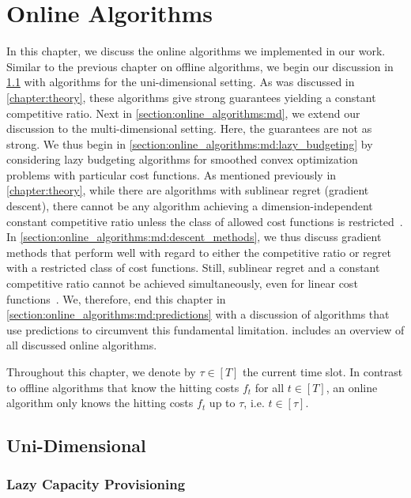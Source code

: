 
\chapter{Online Algorithms}\label{chapter:online_algorithms}

In this chapter, we discuss the online algorithms we implemented in our work. Similar to the previous chapter on offline algorithms, we begin our discussion in \cref{section:online_algorithms:ud} with algorithms for the uni-dimensional setting. As was discussed in \cref{chapter:theory}, these algorithms give strong guarantees yielding a constant competitive ratio. Next in \cref{section:online_algorithms:md}, we extend our discussion to the multi-dimensional setting. Here, the guarantees are not as strong. We thus begin in \cref{section:online_algorithms:md:lazy_budgeting} by considering lazy budgeting algorithms for smoothed convex optimization problems with particular cost functions. As mentioned previously in \cref{chapter:theory}, while there are algorithms with sublinear regret (gradient descent), there cannot be any algorithm achieving a dimension-independent constant competitive ratio unless the class of allowed cost functions is restricted~\cite{Chen2018}. In \cref{section:online_algorithms:md:descent_methods}, we thus discuss gradient methods that perform well with regard to either the competitive ratio or regret with a restricted class of cost functions. Still, sublinear regret and a constant competitive ratio cannot be achieved simultaneously, even for linear cost functions~\cite{Andrew2015}. We, therefore, end this chapter in \cref{section:online_algorithms:md:predictions} with a discussion of algorithms that use predictions to circumvent this fundamental limitation.  includes an overview of all discussed online algorithms.

Throughout this chapter, we denote by $\tau \in [T]$ the current time slot. In contrast to offline algorithms that know the hitting costs $f_t$ for all $t \in [T]$, an online algorithm only knows the hitting costs $f_t$ up to $\tau$, i.e. $t \in [\tau]$.

\section{Uni-Dimensional}\label{section:online_algorithms:ud}

\subsection{Lazy Capacity Provisioning}\label{section:online_algorithms:ud:lazy_capacity_provisioning}

